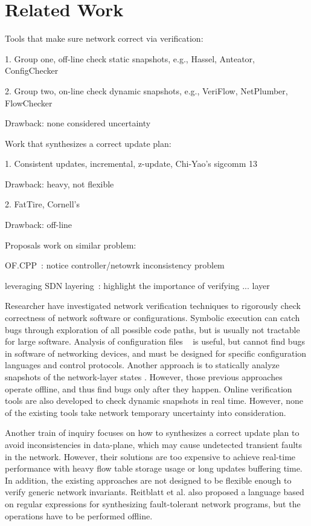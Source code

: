 \section{Related Work}
\label{sec:relwork}

Tools that make sure network correct via verification:

1. Group one, off-line check static snapshots, e.g., Hassel, Anteator, ConfigChecker

2. Group two, on-line check dynamic snapshots, e.g., VeriFlow, NetPlumber, FlowChecker

Drawback: none considered uncertainty

Work that synthesizes a correct update plan:

1. Consistent updates, incremental, z-update, Chi-Yao's sigcomm 13

Drawback: heavy, not flexible

2. FatTire, Cornell's 

Drawback: off-line

Proposals work on similar problem:

OF.CPP~\cite{OFCPP}: notice controller/netowrk inconsistency problem

leveraging SDN layering~\cite{sdnlayering}: highlight the importance of verifying ... layer
\fi

Researcher have investigated network verification techniques to rigorously check correctness of network software or configurations. Symbolic execution \cite{holzmann2004primer} can catch bugs through exploration of all possible code paths, but is usually not tractable for large software. 
Analysis of configuration files ~\cite{visser2003model, vasic2011identifying} is useful, but cannot find bugs in software of networking devices, and must be designed for specific configuration languages and control protocols. Another approach is to statically analyze snapshots of the network-layer states \cite{wang2011openflow, heller2010elastictree, mk+sigcomm+11, cadar2008klee, baier2008principles, flanagan2005dynamic, PHA2012}. However, those previous approaches operate offline, and thus find bugs only after they happen. Online verification tools are also developed \cite{NetPlumber2013, Al-Shaer2010, VeriFlow} to check dynamic snapshots in real time. However, none of the existing tools take network temporary uncertainty into consideration. 

Another train of inquiry \cite{incremental-cu,Reitblatt2012, zUpdate, Hong13} focuses on how to synthesizes a correct update plan to avoid inconsistencies in data-plane, which may cause undetected transient faults in the network. However, their solutions are too expensive to achieve real-time performance with heavy flow table storage usage or long updates buffering time. In addition, the existing approaches are not designed to be flexible enough to verify generic network invariants. Reitblatt et al. \cite{reitblatt2013fattire} also proposed a language based on regular expressions for synthesizing fault-tolerant network programs, but the operations have to be performed offline. 


